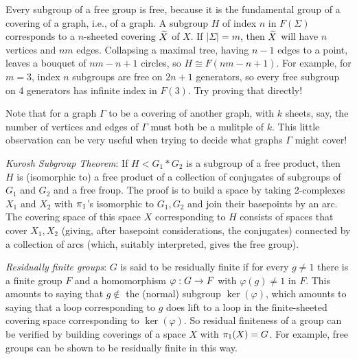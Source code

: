 \bsk



Every
subgroup of a free group is free, because it is the fundamental group of a
covering of a graph, i.e., of a graph.
A subgroup $H$ of index $n$ in $F(\Sigma)$ corresponds to a $n$-sheeted covering $\widetilde{X}$ of $X$. If
$|\Sigma| = m$, then $\widetilde{X}$ will have $n$ vertices and $nm$ edges. Collapsing a maximal
tree, having $n-1$ edges to a point, leaves a bouquet of $nm-n+1$ circles, so $H\cong F(nm-n+1)$.
For example, for $m=3$, index $n$ subgroups are free on $2n+1$ generators, so every free subgroup
on 4 generators has infinite index in $F(3)$. Try proving that directly!

\msk

Note that for a graph $\Gamma$ to be a covering of another graph, with $k$ sheets, say,
the number of vertices and edges of $\Gamma$ must both be a mulitple of $k$. This
little observation can be very useful when trying to decide what graphs $\Gamma$ might
cover!

\msk

{\it Kurosh Subgroup Theorem}: If $H < G_1*G_2$ is a subgroup of
a free product, then $H$ is (isomorphic to) a free product of a
collection of conjugates of subgroups of $G_1$ and $G_2$ and a 
free froup. The proof is to build a space by taking 2-complexes
$X_1$ and $X_2$ with $\pi_1$'s isomorphic to $G_1,G_2$ and join
their basepoints by an arc. The covering space of this space $X$
corresponding to $H$ consists of spaces that cover $X_1,X_2$
(giving, after basepoint considerations, the conjugates)
connected by a collection of arcs (which, suitably interpreted,
gives the free group).

\msk

{\it Residually finite groups}: $G$ is said to be residually finite if for every $g\neq 1$ there is a 
finite group $F$ and a homomorphism $\varphi: G\rightarrow F$ with $\varphi(g)\neq 1$ in $F$. This 
amounts to saying that $g\notin$ the (normal) subgroup $\ker(\varphi)$, which amounts to
saying that a loop corresponding to $g$ does  lift to a loop in the finite-sheeted
covering space corresponding to $\ker(\varphi)$. So residual finiteness of a group can be
verified by building coverings of a space $X$ with $\pi_1(X)=G$. For example, free groups can be
shown to be residually finite in this way. 

\msk

